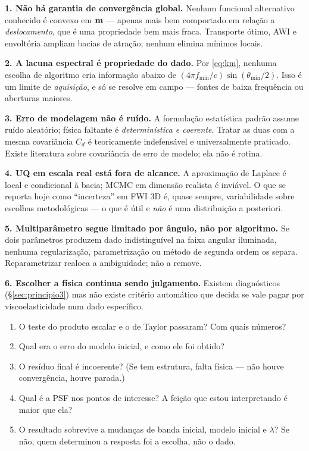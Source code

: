 \documentclass[11pt,a4paper,oneside]{report}
\begin{document}
\begin{teoria}
\textbf{1. N\~ao h\'a garantia de converg\^encia global.} Nenhum funcional
alternativo conhecido \'e convexo em $\mathbf{m}$ --- apenas mais bem comportado em
rela\c{c}\~ao a \emph{deslocamento}, que \'e uma propriedade bem mais fraca.
Transporte \'otimo, AWI e envolt\'oria ampliam bacias de atra\c{c}\~ao;
nenhum elimina m\'inimos locais.

\textbf{2. A lacuna espectral \'e propriedade do dado.} Por
\eqref{eq:km}, nenhuma escolha de algoritmo cria informa\c{c}\~ao abaixo de
$(4\pi f_{\min}/c)\sin(\theta_{\min}/2)$. Isso \'e um limite de
\emph{aquisi\c{c}\~ao}, e s\'o se resolve em campo --- fontes de baixa
frequ\^encia ou aberturas maiores.

\textbf{3. Erro de modelagem n\~ao \'e ru\'ido.} A formula\c{c}\~ao
estat\'istica padr\~ao assume ru\'ido aleat\'orio; f\'isica faltante \'e
\emph{determin\'istica e coerente}. Tratar as duas com a mesma covari\^ancia
$C_d$ \'e teoricamente indefens\'avel e universalmente praticado. Existe
literatura sobre covari\^ancia de erro de modelo; ela n\~ao \'e rotina.

\textbf{4. UQ em escala real est\'a fora de alcance.} A aproxima\c{c}\~ao de
Laplace \'e local e condicional \`a bacia; MCMC em dimens\~ao realista \'e
invi\'avel. O que se reporta hoje como ``incerteza'' em FWI 3D \'e, quase
sempre, variabilidade sobre escolhas metodol\'ogicas --- o que \'e \'util e
\emph{n\~ao} \'e uma distribui\c{c}\~ao a posteriori.

\textbf{5. Multipar\^ametro segue limitado por \^angulo, n\~ao por
algoritmo.} Se dois par\^ametros produzem dado indistingu\'ivel na faixa
angular iluminada, nenhuma regulariza\c{c}\~ao, parametriza\c{c}\~ao ou
m\'etodo de segunda ordem os separa. Reparametrizar realoca a ambiguidade;
n\~ao a remove.

\textbf{6. Escolher a f\'isica continua sendo julgamento.} Existem
diagn\'osticos (§\ref{sec:principio3}) mas n\~ao existe crit\'erio autom\'atico que decida se
vale pagar por viscoelasticidade num dado espec\'ifico.
\end{teoria}

\begin{pratica}
\begin{enumerate}[leftmargin=*, itemsep=2pt]
\item O teste do produto escalar e o de Taylor passaram? Com quais n\'umeros?
\item Qual era o erro do modelo inicial, e como ele foi obtido?
\item O res\'iduo final \'e incoerente? (Se tem estrutura, falta f\'isica ---
n\~ao houve converg\^encia, houve parada.)
\item Qual \'e a PSF nos pontos de interesse? A fei\c{c}\~ao que estou
interpretando \'e maior que ela?
\item O resultado sobrevive a mudan\c{c}as de banda inicial, modelo inicial e
$\lambda$? Se n\~ao, quem determinou a resposta foi a escolha, n\~ao o dado.
\end{enumerate}
\end{pratica}
\end{document}
